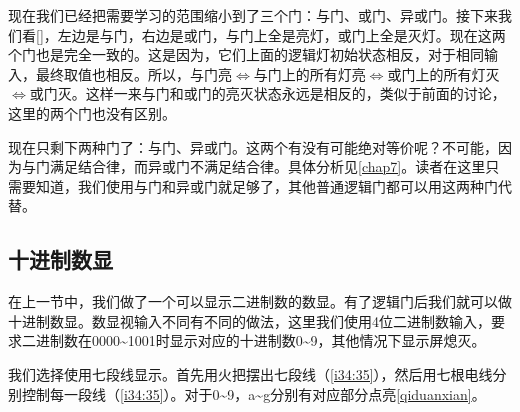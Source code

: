 现在我们已经把需要学习的范围缩小到了三个门：与门、或门、异或门。接下来我们看\autoref{}，左边是与门，右边是或门，与门上全是亮灯，或门上全是灭灯。现在这两个门也是完全一致的。这是因为，它们上面的逻辑灯初始状态相反，对于相同输入，最终取值也相反。所以，与门亮$\Longleftrightarrow$与门上的所有灯亮$\Longleftrightarrow$或门上的所有灯灭$\Longleftrightarrow$或门灭。这样一来与门和或门的亮灭状态永远是相反的，类似于前面的讨论，这里的两个门也没有区别。

现在只剩下两种门了：与门、异或门。这两个有没有可能绝对等价呢？不可能，因为与门满足结合律，而异或门不满足结合律。具体分析见\autoref{chap7}。读者在这里只需要知道，我们使用与门和异或门就足够了，其他普通逻辑门都可以用这两种门代替。

\subsection{十进制数显}\label{sec2:2}

在上一节中，我们做了一个可以显示二进制数的数显。有了逻辑门后我们就可以做十进制数显。数显视输入不同有不同的做法，这里我们使用4位二进制数输入，要求二进制数在0000\~{}1001时显示对应的十进制数0\~{}9，其他情况下显示屏熄灭。

我们选择使用七段线显示。首先用火把摆出七段线（\autoref{i34:35}），然后用七根电线分别控制每一段线（\autoref{i34:35}）。对于0\~{}9，a\~{}g分别有对应部分点亮\autoref{qiduanxian}。

\begin{figure}[!h]
\begin{center}
\quad
{}
\end{center}
\caption{}
\label{i34:35}
\end{figure}

